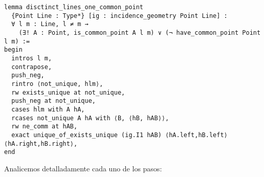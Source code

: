 \begin{lstlisting}
lemma disctinct_lines_one_common_point 
  {Point Line : Type*} [ig : incidence_geometry Point Line] :
  ∀ l m : Line, l ≠ m → 
    (∃! A : Point, is_common_point A l m) ∨ (¬ have_common_point Point l m) := 
begin
  intros l m, 
  contrapose,
  push_neg,
  rintro ⟨not_unique, hlm⟩,
  rw exists_unique at not_unique,
  push_neg at not_unique,
  cases hlm with A hA,
  rcases not_unique A hA with ⟨B, ⟨hB, hAB⟩⟩,
  rw ne_comm at hAB,
  exact unique_of_exists_unique (ig.I1 hAB) ⟨hA.left,hB.left⟩ ⟨hA.right,hB.right⟩,
end
\end{lstlisting}


Analicemos detalladamente cada uno de los pasos:


